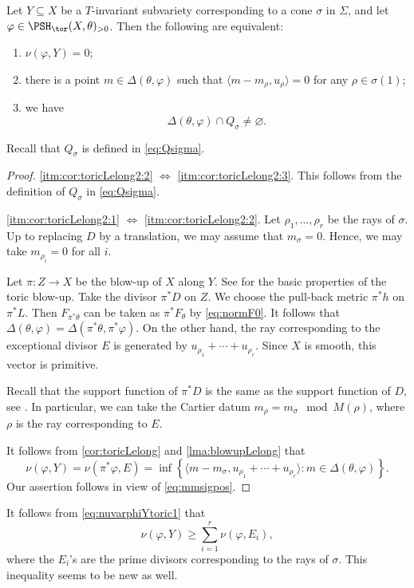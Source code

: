 \begin{corollary}\label{cor:toricLelong2}
    Let $Y\subseteq X$ be a $T$-invariant subvariety corresponding to a cone $\sigma$ in $\Sigma$, and let $\varphi\in \PSH_{\tor}(X,\theta)_{>0}$. Then the following are equivalent:
    \begin{enumerate}
        \item\label{itm:cor:toricLelong2:1} $\nu(\varphi,Y)=0$;
        \item\label{itm:cor:toricLelong2:2} there is a point $m\in \Delta(\theta,\varphi)$ such that $\langle m-m_{\rho},u_{\rho}\rangle=0$ for any $\rho\in \sigma(1)$;
        \item\label{itm:cor:toricLelong2:3} we have
        \[
        \Delta(\theta,\varphi)\cap Q_{\sigma} \neq \varnothing.
        \]
    \end{enumerate}
\end{corollary}
Recall that $Q_{\sigma}$ is defined in \eqref{eq:Qsigma}.
\begin{proof}
    \ref{itm:cor:toricLelong2:2} $\iff$ \ref{itm:cor:toricLelong2:3}. This follows from the definition of $Q_{\sigma}$ in \eqref{eq:Qsigma}.

    \ref{itm:cor:toricLelong2:1} $\iff$ \ref{itm:cor:toricLelong2:2}.
    Let $\rho_1,\ldots,\rho_r$ be the rays of $\sigma$. Up to replacing $D$ by a translation, we may assume that $m_{\sigma}=0$. Hence, we may take $m_{\rho_i}=0$ for all $i$.

    Let $\pi\colon Z\rightarrow X$ be the blow-up of $X$ along $Y$.
    See \cite[Page~132]{CLS11} for the basic properties of the toric blow-up.
    Take the divisor $\pi^*D$ on $Z$.
    We choose the pull-back metric $\pi^*h$ on $\pi^*L$. Then $F_{\pi^*\theta}$ can be taken as $\pi^*F_{\theta}$ by \eqref{eq:normF0}. It follows that $\Delta(\theta,\varphi)=\Delta(\pi^*\theta,\pi^*\varphi)$. On the other hand, the ray corresponding to the exceptional divisor $E$ is generated by $u_{\rho_1}+\cdots+u_{\rho_r}$. Since $X$ is smooth, this vector is primitive.

    Recall that the support function of $\pi^*D$ is the same as the support function of $D$, see \cite[Proposition~6.2.7]{CLS11}.
    In particular, we can take the Cartier datum $m_{\rho}=m_{\sigma} \mod M(\rho)$, where $\rho$ is the ray corresponding to $E$.

    It follows from \cref{cor:toricLelong} and \cref{lma:blowupLelong} that
    \begin{equation}\label{eq:nuvarphiYtoric1}
    \nu(\varphi,Y)=\nu(\pi^*\varphi,E)=
    \inf \left\{ \langle m-m_{\sigma},u_{\rho_1}+\cdots+u_{\rho_r}\rangle:m\in \Delta(\theta,\varphi)\right\}.
    \end{equation}
    Our assertion follows in view of \eqref{eq:mmsigpos}.
\end{proof}
It follows from \eqref{eq:nuvarphiYtoric1} that
\[
\nu(\varphi,Y)\geq \sum_{i=1}^r \nu(\varphi,E_i),
\]
where the $E_i$'s are the prime divisors corresponding to the rays of $\sigma$. This inequality seems to be new as well.



